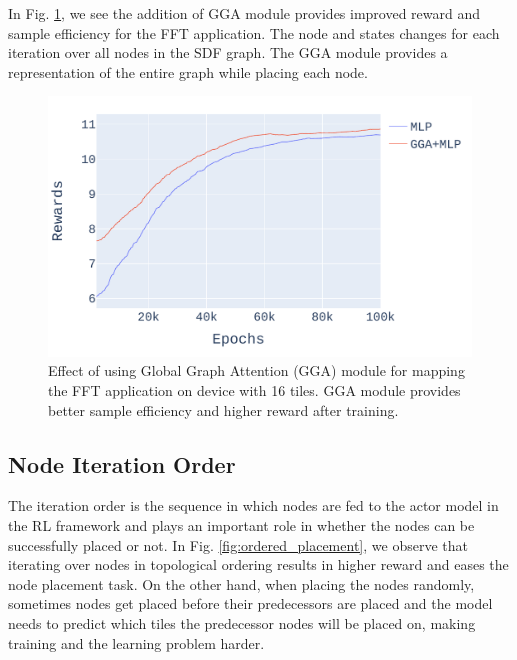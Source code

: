 In Fig. \ref{fig:ifft_rewards}, we see the addition of GGA module provides improved reward and sample efficiency for the FFT application. 
The node and states changes for each iteration over all nodes in the SDF graph. The GGA module provides a representation of the entire graph while placing each node.

\begin{figure}[h]
  \centering
  \includegraphics[width=\linewidth]{fig/plot_gnn_atten_ppo.pdf}
  \caption{Effect of using Global Graph Attention (GGA) module for mapping the FFT application on device with 16 tiles. 
  GGA module provides better sample efficiency and higher reward after training. }
  \label{fig:ifft_rewards}
\end{figure}


\subsection{Node Iteration Order}

The iteration order is the sequence in which nodes are fed to the actor model in the RL framework and plays an important role in whether the nodes can be successfully placed or not. 
In Fig. \ref{fig:ordered_placement}, we observe that iterating over nodes in topological 
ordering results in higher reward and eases the node placement task. 
On the other hand, when placing the nodes randomly, sometimes nodes get placed before their predecessors are placed and the model needs to predict which tiles the predecessor nodes will be placed on, making training and the learning problem harder.

